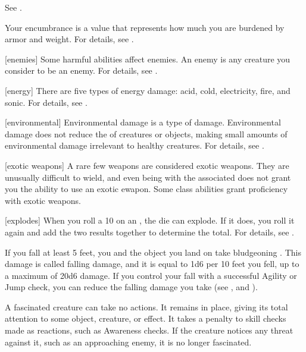  See .

 Your encumbrance is a value that represents how much you are burdened by armor and weight.
For details, see .

[enemies] Some harmful abilities affect enemies.
An enemy is any creature you consider to be an enemy.
For details, see .

[energy] There are five types of energy damage: acid, cold, electricity, fire, and sonic.
For details, see .

[environmental] Environmental damage is a type of damage.
Environmental damage does not reduce the  of creatures or objects, making small amounts of environmental damage irrelevant to healthy creatures.
For details, see .

[exotic weapons] A rare few weapons are considered exotic weapons.
They are unusually difficult to wield, and even being  with the associated  does not grant you the ability to use an exotic ewapon.
Some class abilities grant proficiency with exotic weapons.

[explodes] When you roll a 10 on an , the die can explode.
If it does, you roll it again and add the two results together to determine the total.
For details, see .

 If you fall at least 5 feet, you and the object you land on take bludgeoning .
This damage is called falling damage, and it is equal to 1d6 per 10 feet you fell, up to a maximum of 20d6 damage.
If you control your fall with a successful Agility or Jump check, you can reduce the falling damage you take (see , and ).

 A fascinated creature can take no actions. It remains in place, giving its total attention to some object, creature, or effect. It takes a  penalty to skill checks made as reactions, such as Awareness checks.
If the creature notices any threat against it, such as an approaching enemy, it is no longer fascinated.

